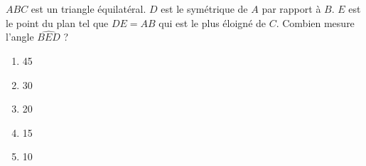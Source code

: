 $ABC$ est un triangle équilatéral. $D$ est le symétrique de $A$ par rapport à $B$. $E$ est le point du plan tel que $DE=AB$ qui est le plus éloigné de $C$. Combien mesure l'angle $\widehat{BED}$ ?
\begin{multicols}{5}
  \begin{enumerate}[A/]
  \item 45\degres
  \item 30\degres
  \item 20\degres
  \item 15\degres
  \item 10\degres
  \end{enumerate}
\end{multicols}